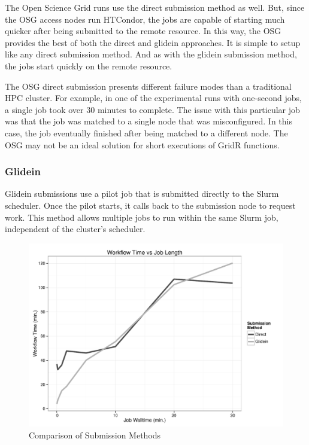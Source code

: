 The Open Science Grid runs use the direct submission method as well.  But, since the OSG access nodes run HTCondor, the jobs are capable of starting much quicker after being submitted to the remote resource.  In this way, the OSG provides the best of both the direct and glidein approaches.  It is simple to setup like any direct submission method.  And as with the glidein submission method, the jobs start quickly on the remote resource.

The OSG direct submission presents different failure modes than a traditional HPC cluster.  For example, in one of the experimental runs with one-second jobs, a single job took over 30 minutes to complete.  The issue with this particular job was that the job was matched to a single node that was misconfigured.  In this case, the job eventually finished after being matched to a different node.  The OSG may not be an ideal solution for short executions of GridR functions.

\subsubsection{Glidein}
Glidein submissions use a pilot job that is submitted directly to the Slurm scheduler.  Once the pilot starts, it calls back to the submission node to request work.  This method allows multiple jobs to run within the same Slurm job, independent of the cluster's scheduler.  

\begin{figure}[h!t]
\centering
\includegraphics[width=\textwidth]{BoscoRImages/ComparisonPlot-color.pdf}
\caption{Comparison of Submission Methods}
\label{fig:comparesubmit}
\end{figure}

